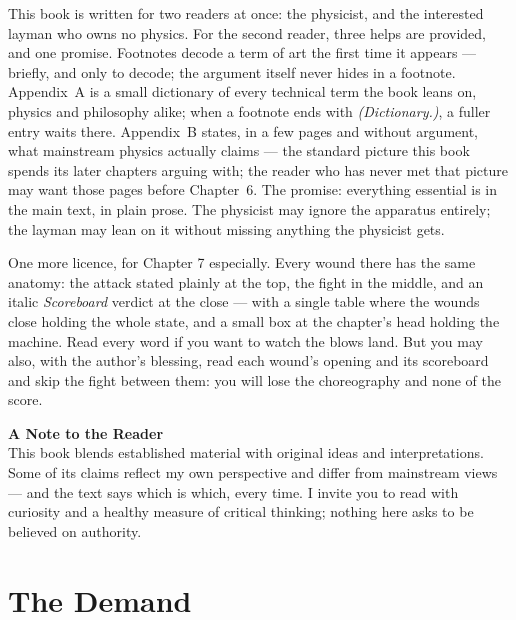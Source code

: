 \documentclass[fontsize=11pt,paper=a4,pagesize=auto,parskip=half-]{scrbook}
\begin{document}
This book is written for two readers at once: the physicist, and the interested layman who owns no physics. For the second reader, three helps are provided, and one promise. Footnotes decode a term of art the first time it appears --- briefly, and only to decode; the argument itself never hides in a footnote. Appendix~A is a small dictionary of every technical term the book leans on, physics and philosophy alike; when a footnote ends with \emph{(Dictionary.)}, a fuller entry waits there. Appendix~B states, in a few pages and without argument, what mainstream physics actually claims --- the standard picture this book spends its later chapters arguing with; the reader who has never met that picture may want those pages before Chapter~6. The promise: everything essential is in the main text, in plain prose. The physicist may ignore the apparatus entirely; the layman may lean on it without missing anything the physicist gets.

One more licence, for Chapter 7 especially. Every wound there has the same anatomy: the attack stated plainly at the top, the fight in the middle, and an italic \emph{Scoreboard} verdict at the close --- with a single table where the wounds close holding the whole state, and a small box at the chapter's head holding the machine. Read every word if you want to watch the blows land. But you may also, with the author's blessing, read each wound's opening and its scoreboard and skip the fight between them: you will lose the choreography and none of the score.

\begin{center}
\begin{minipage}{0.86\textwidth}
\centering
\textbf{A Note to the Reader}\\[0.45em]
This book blends established material with original ideas and interpretations. Some of its claims reflect my own perspective and differ from mainstream views --- and the text says which is which, every time. I invite you to read with curiosity and a healthy measure of critical thinking; nothing here asks to be believed on authority.
\end{minipage}
\end{center}
\mainmatter
\part{The Demand}
\end{document}
